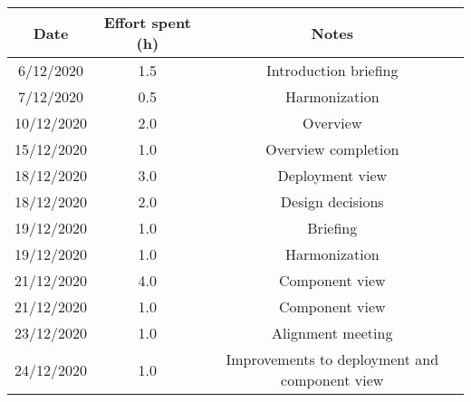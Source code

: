 \documentclass[../../main.tex]{subfiles}
\begin{document}
    \begin{center}
        \begin{tabular}{|c| |c| |c|} 
            \hline
            Date & Effort spent (h) & Notes\\ [0.5ex] 
            \hline\hline
            6/12/2020 & 1.5 & Introduction briefing\\ 
            7/12/2020 & 0.5 & Harmonization\\
            10/12/2020 & 2.0 & Overview\\
            15/12/2020 & 1.0 & Overview completion\\
            18/12/2020 & 3.0 & Deployment view\\
            18/12/2020 & 2.0 & Design decisions\\
            19/12/2020 & 1.0 & Briefing\\
            19/12/2020 & 1.0 & Harmonization\\
            21/12/2020 & 4.0 & Component view\\
            21/12/2020 & 1.0 & Component view\\
            23/12/2020 & 1.0 & Alignment meeting\\
            24/12/2020 & 1.0 & Improvements to deployment and component view\\
            \hline
        \end{tabular}
    \end{center}
\end{document}
